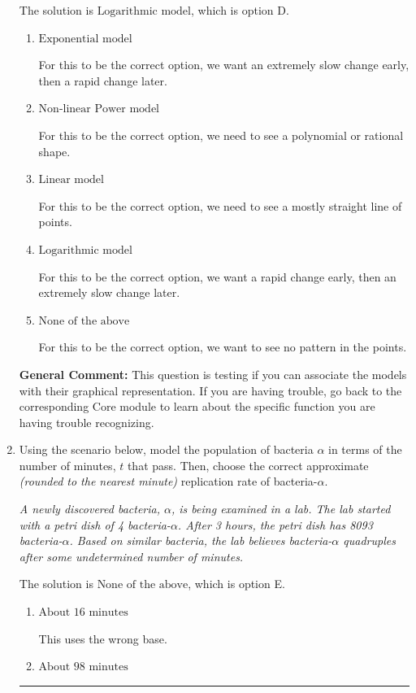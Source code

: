 \documentclass{extbook}[14pt]
\newcommand{\litem}[1]{\item #1

\rule{\textwidth}{0.4pt}}
\begin{document}
\begin{enumerate}
{The solution is \( \text{Logarithmic model} \), which is option D.\begin{enumerate}[label=\Alph*.]
\item \( \text{Exponential model} \)

For this to be the correct option, we want an extremely slow change early, then a rapid change later.
\item \( \text{Non-linear Power model} \)

For this to be the correct option, we need to see a polynomial or rational shape.
\item \( \text{Linear model} \)

For this to be the correct option, we need to see a mostly straight line of points.
\item \( \text{Logarithmic model} \)

For this to be the correct option, we want a rapid change early, then an extremely slow change later.
\item \( \text{None of the above} \)

For this to be the correct option, we want to see no pattern in the points.
\end{enumerate}

\textbf{General Comment:} This question is testing if you can associate the models with their graphical representation. If you are having trouble, go back to the corresponding Core module to learn about the specific function you are having trouble recognizing.
}
\litem{
Using the scenario below, model the population of bacteria $\alpha$ in terms of the number of minutes, $t$ that pass. Then, choose the correct approximate \textit{(rounded to the nearest minute)} replication rate of bacteria-$\alpha$.

\begin{center}
    \textit{ A newly discovered bacteria, $\alpha$, is being examined in a lab. The lab started with a petri dish of 4 bacteria-$\alpha$. After 3 hours, the petri dish has 8093 bacteria-$\alpha$. Based on similar bacteria, the lab believes bacteria-$\alpha$ quadruples after some undetermined number of minutes. }
\end{center}


The solution is \( \text{None of the above} \), which is option E.\begin{enumerate}[label=\Alph*.]
\item \( \text{About } 16 \text{ minutes} \)

This uses the wrong base.
\item \( \text{About } 98 \text{ minutes} \)


\end{enumerate}}
\end{enumerate}
\end{document}
